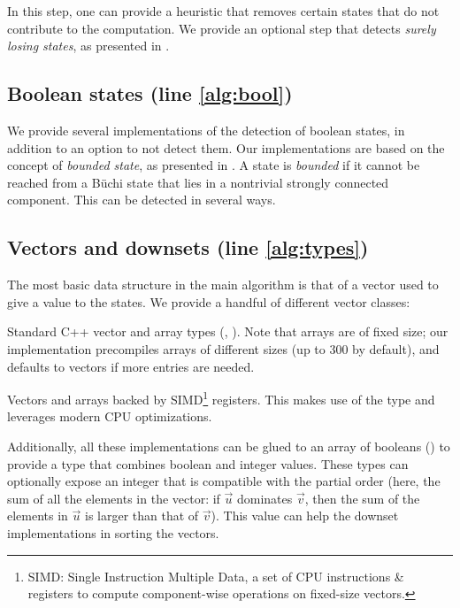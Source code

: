 \documentclass[runningheads,a4paper]{llncs}
\begin{document}
In this step, one can provide a heuristic that removes certain states that
do not contribute to the computation.  We provide an optional step that
detects \emph{surely losing states}, as presented in \cite{ggs14}.

\subsection{Boolean states (line \ref{alg:bool})}\label{sec:implem-bool}

We provide several implementations of the detection of boolean states, in
addition to an option to not detect them.  Our implementations are based on the
concept of \emph{bounded state}, as presented in \cite{bohy14}.  A state is
\emph{bounded} if it cannot be reached from a Büchi state that lies in a
nontrivial strongly connected component.  This 
can be detected in
several ways.%

\subsection{Vectors and downsets (line \ref{alg:types})}\label{sec:vecds}

The most basic data structure in the main algorithm is that of a vector used to
give a value to the states.  We provide a handful of different vector
classes:
\begin{compactitem}
\item Standard C++ vector and array types (,\linebreak
  ).  Note that arrays are of fixed size; our implementation
  precompiles arrays of different sizes (up to \(300\) by default),
  and defaults to vectors if more entries are needed.
\item Vectors and arrays backed by SIMD\footnote{SIMD: Single Instruction
  Multiple Data, a set of CPU instructions \& registers to compute
  component-wise operations on fixed-size vectors.} registers.  This makes use of the
  type  and leverages modern CPU
  optimizations.
\end{compactitem}

Additionally, all these implementations can be glued to an array of booleans
() to provide a type that combines boolean and integer
values.  These types can optionally expose an integer that is compatible with
the partial order (here, the sum of all the elements in the vector: if
\(\vec{u}\) dominates \(\vec{v}\), then the sum of the elements in \(\vec{u}\) is
larger than that of \(\vec{v}\)).  This value can help the downset implementations
in sorting the vectors.
\end{document}
